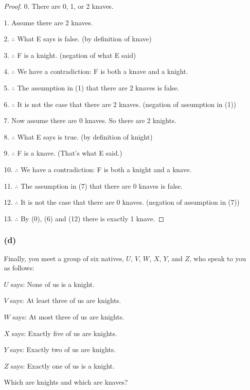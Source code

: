 \documentclass[14pt]{extarticle}
\begin{document}
\begin{proof}
    0. There are 0, 1, or 2 knaves.

    1. Assume there are 2 knaves.

    2. $\therefore$ What E says is false. (by definition of knave)

    3. $\therefore$ F is a knight. (negation of what E said)

    4. $\therefore$ We have a contradiction: F is both a knave and a knight.

    5. $\therefore$ The assumption in (1) that there are 2 knaves is false.

    6. $\therefore$ It is not the case that there are 2 knaves. (negation of assumption in (1))

    7. Now assume there are 0 knaves. So there are 2 knights.

    8. $\therefore$ What E says is true. (by definition of knight)

    9. $\therefore$ F is a knave. (That's what E said.)

    10. $\therefore$ We have a contradiction: F is both a knight and a knave.

    11. $\therefore$ The assumption in (7) that there are 0 knaves is false.

    12. $\therefore$ It is not the case that there are 0 knaves. (negation of assumption in (7))

    13. $\therefore$ By (0), (6) and (12) there is exactly 1 knave. \end{proof}

\subsubsection{(d)}
Finally, you meet a group of six natives, $U$, $V$, $W$, $X$, $Y$, and $Z$, who speak to you as follows:

$U$ says: None of us is a knight.

$V$ says: At least three of us are knights.

$W$ says: At most three of us are knights.

$X$ says: Exactly five of us are knights.

$Y$ says: Exactly two of us are knights.

$Z$ says: Exactly one of us is a knight.

Which are knights and which are knaves?
\end{document}
